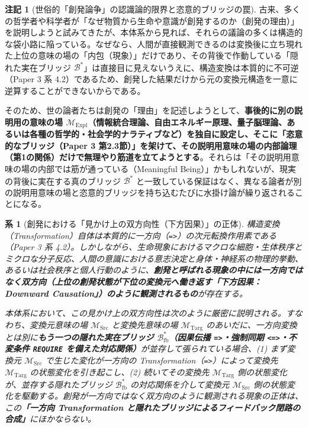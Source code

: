 \documentclass[11pt,a4paper]{ltjsarticle}
\theoremstyle{definition}
\newtheorem{remark}{注記}[section]
\theoremstyle{plain}
\newtheorem{corollary}{系}[section]
\begin{document}
\begin{remark}[世俗的「創発論争」の認識論的限界と恣意的ブリッジの罠]
古来、多くの哲学者や科学者が「なぜ物質から生命や意識が創発するのか（創発の理由）」を説明しようと試みてきたが、本体系から見れば、それらの議論の多くは構造的な袋小路に陥っている。なぜなら、人間が直接観測できるのは変換後に立ち現れた上位の意味の場の「内包（現象）」だけであり、その背後で作動している「隠れた実在ブリッジ $\mathcal{B}^*$」は直接目に見えないうえに、構造変換は本質的に不可逆（Paper 3 \cite{Ota2026_3} 系 4.2）であるため、創発した結果だけから元の変換元構造を一意に逆算することができないからである。

そのため、世の論者たちは創発の「理由」を記述しようとして、\textbf{事後的に別の説明用の意味の場 $\mathcal{M}_{\mathrm{Expl}}$（情報統合理論、自由エネルギー原理、量子脳理論、あるいは各種の哲学的・社会学的ナラティブなど）を独自に設定し、そこに「恣意的なブリッジ（Paper 3 \cite{Ota2026_3} 第2.3節）」を架けて、その説明用意味の場の内部論理（第1の関係）だけで無理やり筋道を立てようとする}。それらは「その説明用意味の場の内部では筋が通っている（Meaningful Being）」かもしれないが、現実の背後に実在する真のブリッジ $\mathcal{B}^*$ と一致している保証はなく、異なる論者が別の説明用意味の場と恣意的ブリッジを持ち込むたびに水掛け論が繰り返されることになる。
\end{remark}

\begin{corollary}[創発における「見かけ上の双方向性（下方因果）」の正体]
構造変換（Transformation）自体は本質的に一方向（\texttt{=>}）の次元転換作用素である（Paper 3 \cite{Ota2026_3} 系 4.2）。しかしながら、生命現象におけるマクロな細胞・生体秩序とミクロな分子反応、人間の意識における意志決定と身体・神経系の物理的挙動、あるいは社会秩序と個人行動のように、\textbf{創発と呼ばれる現象の中には一方向ではなく双方向（上位の創発状態が下位の変換元へ働き返す「下方因果：Downward Causation」）のように観測されるもの}が存在する。

本体系において、この見かけ上の双方向性は次のように厳密に説明される。すなわち、変換元意味の場 $\mathcal{M}_{\mathrm{Src}}$ と変換先意味の場 $\mathcal{M}_{\mathrm{Targ}}$ のあいだに、一方向変換とは別に\textbf{もう一つの隠れた実在ブリッジ $\mathcal{B}_{\mathrm{fb}}^*$（因果伝播 \texttt{=>}・強制同期 \texttt{<=>}・不変条件 \texttt{REQUIRE} を備えた対応関係）}が並存して張られている場合、(1) まず変換元 $\mathcal{M}_{\mathrm{Src}}$ で生じた変化が一方向の Transformation（\texttt{=>}）によって変換先 $\mathcal{M}_{\mathrm{Targ}}$ の状態変化を引き起こし、(2) 続いてその変換先 $\mathcal{M}_{\mathrm{Targ}}$ 側の状態変化が、並存する隠れたブリッジ $\mathcal{B}_{\mathrm{fb}}^*$ の対応関係を介して変換元 $\mathcal{M}_{\mathrm{Src}}$ 側の状態変化を駆動する。創発が一方向ではなく双方向のように観測される現象の正体は、この\textbf{「一方向 Transformation と隠れたブリッジによるフィードバック閉路の合成」}にほかならない。
\end{corollary}
\end{document}
